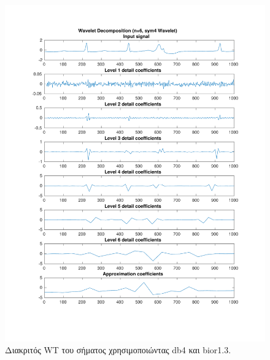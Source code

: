\documentclass[11pt,a4paper]{article}
\begin{document}
\begin{figure}[H]
\begin{minipage}{0.48\textwidth}
	\includegraphics[width=\textwidth]{fig/221l1_dwt2.pdf}
\end{minipage}
\vfill
\caption{Διακριτός WT του σήματος χρησιμοποιώντας db4 και bior1.3.}
\label{fig:221l1_dwt}
\end{figure}
\end{document}

